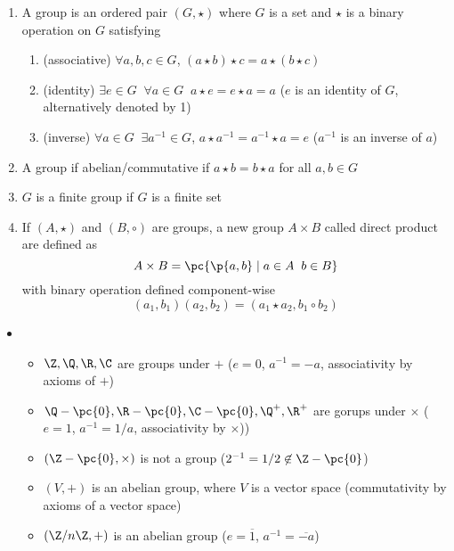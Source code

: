 \documentclass[11pt]{article}
\begin{document}
\begin{definition*}
    \begin{enumerate}
        \item {} A group is an ordered pair $(G,\star)$ where $G$ is a set and $\star$ is a binary operation on $G$ satisfying 
        \begin{enumerate}
            \item (associative) $\forall a,b,c\in G$, $(a\star b) \star c = a\star (b \star c)$
            \item (identity) $\exists e\in G \;\; \forall a\in G \;\;  a\star e = e \star a = a$ ($e$ is an identity of $G$, alternatively denoted by 1)
            \item (inverse) $\forall a\in G \;\; \exists a^{-1}\in G$, $a\star a^{-1}  = a^{-1} \star a = e$ ($a^{-1}$ is an inverse of $a$)
        \end{enumerate}
        \item {} A group if abelian/commutative if $a\star b = b\star a$ for all $a,b\in G$ 
        \item {} $G$ is a finite group if $G$ is a finite set
        \item {} If $(A, \star)$ and $(B, \circ)$ are groups, a new group $A\times B$ called direct product are defined as 
        \[
            A\times B = \pc{\p{a,b} \mid a\in A \;\; b\in B}
        \]
        with binary operation defined component-wise 
        \[
            (a_1, b_1)(a_2, b_2) = (a_1 \star a_2, b_1 \circ b_2)    
        \]
    \end{enumerate}
    \begin{itemize}
        \item {}
        \begin{itemize}
            \item $\Z,\Q,\R,\C$ are groups under $+$ ($e=0$, $a^{-1} = -a$, associativity by axioms of $+$)
            \item $\Q - \pc{0}, \R-\pc{0}, \C-\pc{0}, \Q^+, \R^+$ are gorups under $\times$ ($e = 1$, $a^{-1} = 1/a$, associativity by $\times$))
            \item $(\Z - \pc{0}, \times )$ is not a group ($2^{-1} = 1/2\not\in \Z - \pc{0}$)
            \item $(V,+)$ is an abelian group, where $V$ is a vector space (commutativity by axioms of a vector space)
            \item $(\integermodn, +)$ is an abelian group ($e = \overline{1}$, $a^{-1} = \overline{-a}$)

\end{itemize}
\end{itemize}
\end{definition*}
\end{document}
